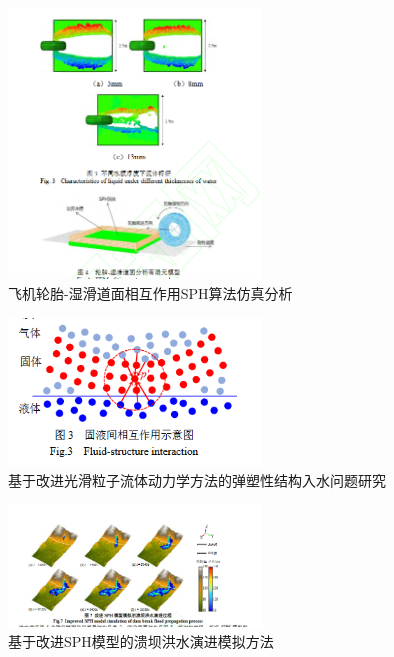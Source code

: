 \begin{frame}
    \begin{figure}[H]
        \centering
        \includegraphics[width=0.6\textwidth]{images//luntai.png}
        \caption{飞机轮胎-湿滑道面相互作用SPH算法仿真分析\cite{_-sph_nodate}}
    \end{figure}
\end{frame}

\begin{frame}
        \begin{figure}[H]
            \centering
            \includegraphics[width=0.6\textwidth]{images//tansuxing.png}
            \caption{基于改进光滑粒子流体动力学方法的弹塑性结构入水问题研究\cite{__nodate}}
        \end{figure}
\end{frame}

\begin{frame}
    \begin{figure}[H]
        \centering
        \includegraphics[width=0.6\textwidth]{images//kuibahongshui.png}
        \caption{基于改进SPH模型的溃坝洪水演进模拟方法\cite{_sph_nodate-2}}
    \end{figure}
\end{frame}

